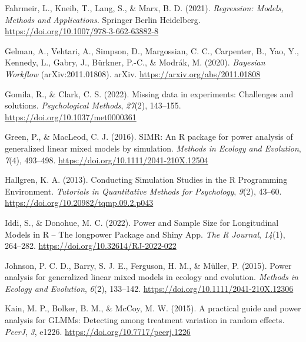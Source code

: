\documentclass[
  man,
  floatsintext,
  longtable,
  a4paper,
  nolmodern,
  notxfonts,
  notimes,
  colorlinks=true,linkcolor=blue,citecolor=blue,urlcolor=blue]{apa7}
\newlength{\cslhangindent}
\newenvironment{CSLReferences}[2] %
 {\begin{list}{}{%
  \setlength{\itemindent}{0pt}
  \setlength{\leftmargin}{0pt}
  \setlength{\parsep}{0pt}
  \ifodd #1
   \setlength{\leftmargin}{\cslhangindent}
   \setlength{\itemindent}{-1\cslhangindent}
  \fi
  \setlength{\itemsep}{#2\baselineskip}}}
 {\end{list}}
\begin{document}
\begin{CSLReferences}{1}{0}
Fahrmeir, L., Kneib, T., Lang, S., \& Marx, B. D. (2021).
\emph{Regression: {Models}, {Methods} and {Applications}}. Springer
Berlin Heidelberg. \url{https://doi.org/10.1007/978-3-662-63882-8}

Gelman, A., Vehtari, A., Simpson, D., Margossian, C. C., Carpenter, B.,
Yao, Y., Kennedy, L., Gabry, J., Bürkner, P.-C., \& Modrák, M. (2020).
\emph{Bayesian {Workflow}} (arXiv:2011.01808). arXiv.
\url{https://arxiv.org/abs/2011.01808}

Gomila, R., \& Clark, C. S. (2022). Missing data in experiments:
{Challenges} and solutions. \emph{Psychological Methods}, \emph{27}(2),
143--155. \url{https://doi.org/10.1037/met0000361}

Green, P., \& MacLeod, C. J. (2016). {SIMR}: An {R} package for power
analysis of generalized linear mixed models by simulation. \emph{Methods
in Ecology and Evolution}, \emph{7}(4), 493--498.
\url{https://doi.org/10.1111/2041-210X.12504}

Hallgren, K. A. (2013). Conducting {Simulation Studies} in the {R
Programming Environment}. \emph{Tutorials in Quantitative Methods for
Psychology}, \emph{9}(2), 43--60.
\url{https://doi.org/10.20982/tqmp.09.2.p043}

Iddi, S., \& Donohue, M. C. (2022). Power and {Sample Size} for
{Longitudinal Models} in {R} -- {The} longpower {Package} and {Shiny
App}. \emph{The R Journal}, \emph{14}(1), 264--282.
\url{https://doi.org/10.32614/RJ-2022-022}

Johnson, P. C. D., Barry, S. J. E., Ferguson, H. M., \& Müller, P.
(2015). Power analysis for generalized linear mixed models in ecology
and evolution. \emph{Methods in Ecology and Evolution}, \emph{6}(2),
133--142. \url{https://doi.org/10.1111/2041-210X.12306}

Kain, M. P., Bolker, B. M., \& McCoy, M. W. (2015). A practical guide
and power analysis for {GLMMs}: Detecting among treatment variation in
random effects. \emph{PeerJ}, \emph{3}, e1226.
\url{https://doi.org/10.7717/peerj.1226}


\end{CSLReferences}
\end{document}
